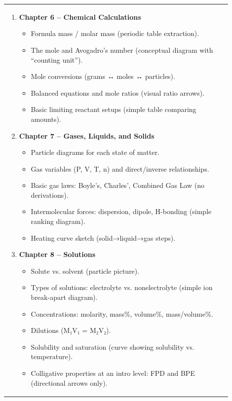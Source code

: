 \documentclass{article}
\begin{document}
\begin{tabular}{|p{0.9\linewidth}|}
\hline
\begin{enumerate}
    \item \textbf{Chapter 6 – Chemical Calculations}
    \begin{itemize}
        \item Formula mass / molar mass (periodic table extraction).
        \item The mole and Avogadro’s number (conceptual diagram with “counting unit”).
        \item Mole conversions (grams ↔ moles ↔ particles).
        \item Balanced equations and mole ratios (visual ratio arrows).
        \item Basic limiting reactant setups (simple table comparing amounts).
    \end{itemize}

    \item \textbf{Chapter 7 – Gases, Liquids, and Solids}
    \begin{itemize}
        \item Particle diagrams for each state of matter.
        \item Gas variables (P, V, T, n) and direct/inverse relationships.
        \item Basic gas laws: Boyle’s, Charles’, Combined Gas Law (no derivations).
        \item Intermolecular forces: dispersion, dipole, H-bonding (simple ranking diagram).
        \item Heating curve sketch (solid→liquid→gas steps).
    \end{itemize}

    \item \textbf{Chapter 8 – Solutions}
    \begin{itemize}
        \item Solute vs. solvent (particle picture).
        \item Types of solutions: electrolyte vs. nonelectrolyte (simple ion break-apart diagram).
        \item Concentrations: molarity, mass\%, volume\%, mass/volume\%.
        \item Dilutions (M₁V₁ = M₂V₂).
        \item Solubility and saturation (curve showing solubility vs. temperature).
        \item Colligative properties at an intro level: FPD and BPE (directional arrows only).
    \end{itemize}


\end{enumerate}
\end{tabular}
\end{document}
